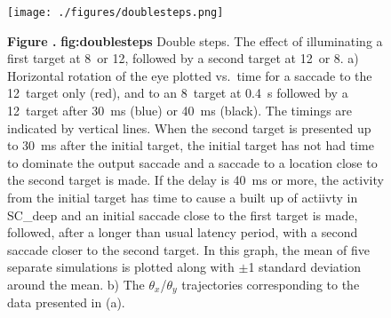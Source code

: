 \documentclass{frontiersSCNS}
\begin{document}
\begin{figure}[htb!]
\begin{center}
\texttt{[image: ./figures/doublesteps.png]}
\end{center}
\textbf{\label{fig:doublesteps} Figure .}
{ \textbf{fig:doublesteps} Double steps. The effect of illuminating a first target
at 8\dg~or 12\dg, followed by a second target at 12\dg~or 8\dg. a) Horizontal
rotation of the eye plotted vs.~time for a saccade to the 12\dg~target only (red),
and to an 8\dg~target at 0.4~s followed by a 12\dg~target after 30~ms (blue) or
40~ms (black). The timings are indicated by vertical lines. When the second
target is presented up to 30~ms after the initial target, the initial target
has not had time to dominate the output saccade and a saccade to a location
close to the second target is made. If the delay is 40~ms or more, the activity
from the initial target has time to cause a built up of actiivty in SC\_deep
and an initial saccade close to the first target is made, followed, after a
longer than usual latency period, with a second saccade closer to the second
target. In this graph, the mean of five separate simulations is plotted along
with $\pm$1 standard deviation around the mean. b) The $\theta_{x}$/$\theta_{y}$
trajectories corresponding to the data presented in (a).}
\end{figure}

\end{document}
